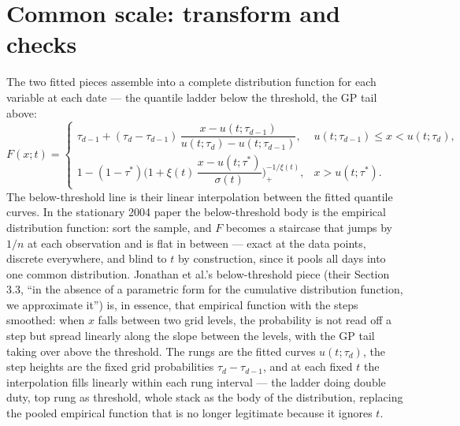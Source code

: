 \documentclass[11pt]{article}
\begin{document}
\section{Common scale: transform and checks}\label{sec:common}

The two fitted pieces assemble into a complete distribution function for each variable at each date --- the quantile ladder below the threshold, the GP tail above:
\begin{equation}\label{eq:F}
F(x; t) =
\begin{cases}
\tau_{d-1} + (\tau_d - \tau_{d-1})\, \dfrac{x - u(t; \tau_{d-1})}{u(t; \tau_d) - u(t; \tau_{d-1})}, & u(t; \tau_{d-1}) \le x < u(t; \tau_d),\\[12pt]
1 - (1 - \tau^{*}) \biggl(1 + \xi(t)\, \dfrac{x - u(t; \tau^{*})}{\sigma(t)}\biggr)_{\!+}^{-1/\xi(t)}, & x > u(t; \tau^{*}).
\end{cases}
\end{equation}
The below-threshold line is their linear interpolation between the fitted quantile curves. {\color{blue} In the stationary 2004 paper the below-threshold body is the empirical distribution function: sort the sample, and $F$ becomes a staircase that jumps by $1/n$ at each observation and is flat in between --- exact at the data points, discrete everywhere, and blind to $t$ by construction, since it pools all days into one common distribution. Jonathan et al.'s below-threshold piece (their Section 3.3, ``in the absence of a parametric form for the cumulative distribution function, we approximate it'') is, in essence, that empirical function with the steps smoothed: when $x$ falls between two grid levels, the probability is not read off a step but spread linearly along the slope between the levels, with the GP tail taking over above the threshold. The rungs are the fitted curves $u(t; \tau_d)$, the step heights are the fixed grid probabilities $\tau_d - \tau_{d-1}$, and at each fixed $t$ the interpolation fills linearly within each rung interval --- the ladder doing double duty, top rung as threshold, whole stack as the body of the distribution, replacing the pooled empirical function that is no longer legitimate because it ignores $t$.} 
\end{document}
